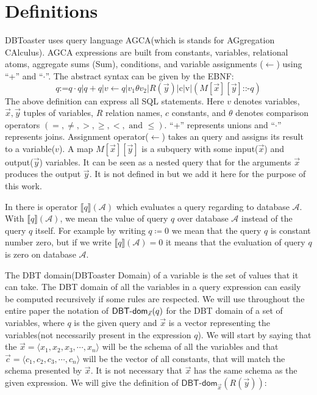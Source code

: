 \documentclass[12pt]{article}
\newcommand{\dom}{\textsf{DBT-dom}}
\begin{document}
\section{Definitions}\label{defin}
DBToaster uses query language AGCA(which is stands for AGgregation CAlculus). 
AGCA expressions are built from constants, variables, relational atoms, aggregate sums (Sum), conditions, and variable assignments ($\gets$) using ``+''  and ``$\cdot$''. The abstract syntax can be given by the EBNF:
\begin{equation}
\label{def:agca}
q\text{:=}q\cdot q | q + q|v \gets q |v_{1}\theta v_{2}|R(\vec{y})|\text{c}|\text{v}|(M[\vec{x}][\vec{y}]\text{::-}q)
\end{equation}
The above definition can express all SQL statements. Here $v$ denotes variables, $\vec{x},\vec{y}$ tuples of variables, $R$ relation names, $c$ constants, and $\theta$ denotes comparison operators $(=,\neq, >, \geq, <, \text{ and }\leq)$.
 ``+'' represents unions and ``$\cdot$'' represents joins. Assignment operator($\gets$) takes an query and assigns its result to a variable($v$). A map $M[\vec{x}][\vec{y}]$ is a subquery with some input($\vec{x}$) and output($\vec{y}$) variables. It can be seen as a nested query that for the arguments $\vec{x}$ produces the output $\vec{y}$. It is not defined in \cite{1} but we add it here for the purpose of this work.\par
 In \cite{2} there is operator $\llbracket q\rrbracket(\mathcal{A})$ which evaluates a query regarding to database $\mathcal{A}$. With $\llbracket q\rrbracket(\mathcal{A})$, we mean the value of query $q$ over database $\mathcal{A}$ instead of the query $q$ itself. For example by writing $q\coloneqq 0$ we mean that the query $q$ is constant number zero, but if we write $\llbracket q\rrbracket(\mathcal{A})= 0$ it means that the evaluation of query $q$ is zero on database $\mathcal{A}$. 

The DBT domain(DBToaster Domain) of a variable is the set of values that it can take. The DBT domain of all the variables in a query expression can easily be computed recursively if some rules are respected. We will use throughout the entire paper the notation of $\text{\dom{}}_{\vec x}(q)$ for the DBT domain of a set of variables, where $q$ is the given query and $\vec x$ is a vector representing the variables(not necessarily present in the expression $q$). We will start by saying that the $\vec x=\langle x_1,x_2,x_3,\cdots,x_n\rangle$ will be the schema of all the variables 
and that $\vec c=\langle c_1,c_2,c_3,\cdots,c_n\rangle$ will be the vector of all constants, that will match the schema presented by $\vec x$. It is not necessary that $\vec{x}$  has the same schema as the given expression. We will give the definition of $\dom{}_{\vec x}(R(\vec y))$:
\end{document}
